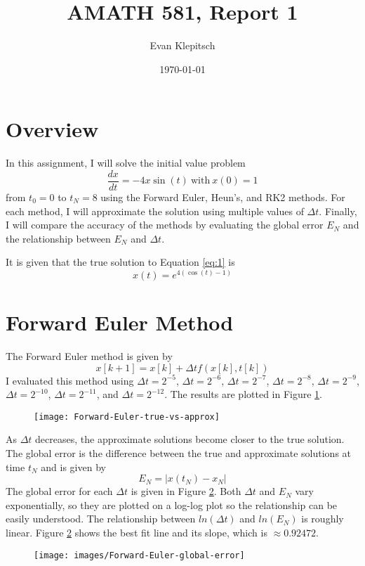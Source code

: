 \documentclass{article}
\title{AMATH 581, Report 1}
\author{Evan Klepitsch}
\date{\today}
\begin{document}
\maketitle
\section{Overview}
In this assignment, I will solve the initial value problem
\begin{equation} \label{eq:1}
    \frac{dx}{dt} = -4x\sin(t)\ \textrm{with}\ x(0) = 1
\end{equation}
from $t_0 = 0$ to $t_N = 8$ using the Forward Euler, Heun's, and RK2 methods.  For each method, I will approximate the solution using multiple values of $\Delta t$.  Finally, I will compare the accuracy of the methods by evaluating the global error $E_N$ and the relationship between $E_N$ and $\Delta t$.

It is given that the true solution to Equation \ref{eq:1} is
\begin{equation} \label{eq:2}
    x(t) = e^{4(\cos(t) - 1)}
\end{equation}
\section{Forward Euler Method}
The Forward Euler method is given by
\begin{equation} \label{eq:3}
    x[k+1] = x[k] + {\Delta t}f(x[k], t[k])
\end{equation}
I evaluated this method using $\Delta t = 2^{-5}$, $\Delta t = 2^{-6}$, $\Delta t = 2^{-7}$, $\Delta t = 2^{-8}$, $\Delta t = 2^{-9}$, $\Delta t = 2^{-10}$, $\Delta t = 2^{-11}$, and $\Delta t = 2^{-12}$.  The results are plotted in Figure \ref{fig:forward-euler-approximations}.
\begin{figure}[H]
    \caption{}
    \centering
    \texttt{[image: Forward-Euler-true-vs-approx]}
    \label{fig:forward-euler-approximations}
\end{figure}
As $\Delta t$ decreases, the approximate solutions become closer to the true solution.  The global error is the difference between the true and approximate solutions at time $t_N$ and is given by
\begin{equation} \label{eq:4}
    E_N = |x(t_N) - x_N|
\end{equation}
The global error for each $\Delta t$ is given in Figure \ref{fig:forward-euler-global-error}.  Both $\Delta t$ and $E_N$ vary exponentially, so they are plotted on a log-log plot so the relationship can be easily understood.  The relationship between $ln(\Delta t)$ and $ln(E_N)$ is roughly linear.  Figure \ref{fig:forward-euler-global-error} shows the best fit line and its slope, which is $\approx 0.92472$.
\begin{figure}[H]
    \caption{}
    \centering
    \texttt{[image: images/Forward-Euler-global-error]}
    \label{fig:forward-euler-global-error}
\end{figure}
\end{document}

